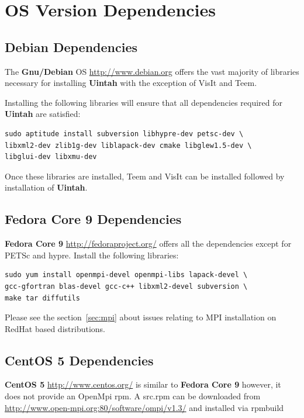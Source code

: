 \documentclass[12pt]{article}
\begin{document}
\section{OS Version Dependencies}

\subsection{Debian Dependencies}

The \textbf{Gnu/Debian} OS \url{http://www.debian.org} offers the vast majority of libraries necessary for
installing \textbf{Uintah} with the exception of VisIt and Teem.

Installing the following libraries will ensure that all dependencies
required for \textbf{Uintah} are satisfied: 

\begin{verbatim} 
sudo aptitude install subversion libhypre-dev petsc-dev \ 
libxml2-dev zlib1g-dev liblapack-dev cmake libglew1.5-dev \
libglui-dev libxmu-dev
\end{verbatim}

Once these libraries are installed, Teem and VisIt can be installed
followed by installation of \textbf{Uintah}.

\subsection{Fedora Core 9 Dependencies}

\textbf{Fedora Core 9} \url{http://fedoraproject.org/} offers all the
dependencies except for PETSc and hypre.  Install the following
libraries:
\begin{verbatim}
sudo yum install openmpi-devel openmpi-libs lapack-devel \
gcc-gfortran blas-devel gcc-c++ libxml2-devel subversion \ 
make tar diffutils
\end{verbatim}

Please see the section~\ref{sec:mpi} about issues relating to MPI
installation on RedHat based distributions.


\subsection{CentOS 5 Dependencies}

\textbf{CentOS 5} \url{http://www.centos.org/} is similar to \textbf{Fedora
Core 9} however, it does not provide an OpenMpi rpm.  A src.rpm can be
downloaded from \url{http://www.open-mpi.org:80/software/ompi/v1.3/}
and installed via rpmbuild
\end{document}
